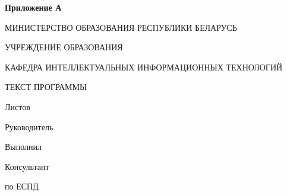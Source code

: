 \begin{flushright}
    \textbf{Приложение А}
\end{flushright}
\begin{center}
    МИНИСТЕРСТВО ОБРАЗОВАНИЯ РЕСПУБЛИКИ БЕЛАРУСЬ

    УЧРЕЖДЕНИЕ ОБРАЗОВАНИЯ

    КАФЕДРА ИНТЕЛЛЕКТУАЛЬНЫХ ИНФОРМАЦИОННЫХ ТЕХНОЛОГИЙ
\end{center}

\vfill

\begin{center}
    \TitlePageTopic
\end{center}

\vfill

\begin{center}
    ТЕКСТ ПРОГРАММЫ
\end{center}

\vfill

\begin{center}
    \codeAttachmetSignature
\end{center}

\vfill


\begin{center}
    Листов~\pageref{LastPage}
\end{center}

\vfill

\begin{flushright}
    \begin{minipage}[t]{7cm}
        Руководитель

        \vspace{4mm}

        Выполнил

        \vspace{4mm}

        Консультант

        по ЕСПД
    \end{minipage}
    \begin{minipage}[t]{7cm}
        \titlePageTeacherSurname~\titlePageTeacherName

        \vspace{4mm}

        \titlePageStudentSurname~\titlePageStudentName

        \vspace{4mm}

        \titlePageTeacherSurname~\titlePageTeacherName
    \end{minipage}
\end{flushright}

\vfill

\begin{center}
    \titlePageCity~\ESKDtheYear
\end{center}


